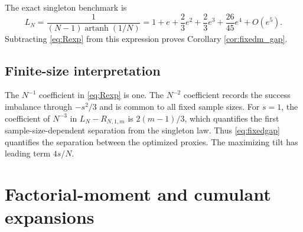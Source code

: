 \documentclass[11pt,a4paper]{article}
\begin{document}
The exact singleton benchmark is
\begin{equation}\label{eq:singletonL}
 L_N=\frac{1}{(N-1)\operatorname{artanh}(1/N)}
 =1+e+\frac23e^2+\frac23e^3+\frac{26}{45}e^4+O(e^5).
\end{equation}
Subtracting \eqref{eq:Rexp} from this expression proves Corollary \ref{cor:fixedm_gap}.

\subsection{Finite-size interpretation}
The $N^{-1}$ coefficient in \eqref{eq:Rexp} is one. The $N^{-2}$ coefficient records the success imbalance through $-s^2/3$ and is common to all fixed sample sizes. For $s=1$, the coefficient of $N^{-3}$ in $L_N-R_{N,1,m}$ is $2(m-1)/3$, which quantifies the first sample-size-dependent separation from the singleton law. Thus \eqref{eq:fixedgap} quantifies the separation between the optimized proxies. The maximizing tilt has leading term $4s/N$.



\section{Factorial-moment and cumulant expansions}\label{app:cumulants}
\end{document}
